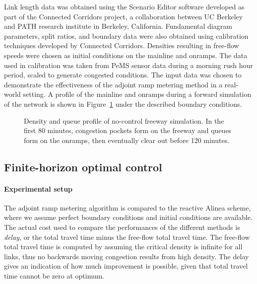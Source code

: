 Link length data was obtained using the Scenario Editor software developed
as part of the Connected Corridors project, a collaboration between
UC Berkeley and PATH research institute in Berkeley, California.
Fundamental diagram parameters, split ratios, and boundary data were
also obtained using calibration techniques developed by Connected
Corridors. Densities resulting in free-flow speeds were chosen as
initial conditions on the mainline and onramps. The data used in calibration
was taken from PeMS sensor data during a morning rush hour period,
scaled to generate congested conditions. The input data was chosen
to demonstrate the effectiveness of the adjoint ramp metering method
in a real-world setting. A profile of the mainline and onramps during
a forward simulation of the network is shown in Figure~\ref{fig:Density-and-queue}
under the described boundary conditions.
\begin{figure}
\hfill{}

\caption{Density and queue profile of no-control freeway simulation. In the
first 80 minutes, congestion pockets form on the freeway and queues
form on the onramps, then eventually clear out before 120 minutes.\label{fig:Density-and-queue}}
\end{figure}



\subsection{Finite-horizon optimal control\label{sub:Finite-horizon-optimal-control}}


\paragraph{Experimental setup}

The adjoint ramp metering algorithm is compared to the reactive Alinea
scheme, where we assume perfect boundary conditions and initial conditions
are available. The actual cost used to compare the performances of
the different methods is \emph{delay}, or the total travel time minus
the free-flow total travel time. The free-flow total travel time is
computed by assuming the critical density is infinite for all links,
thus no backwards moving congestion results from high density. The
delay gives an indication of how much improvement is possible, given
that total travel time cannot be zero at optimum.


